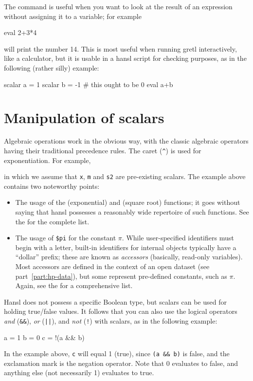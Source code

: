 
The  command is useful when you want to look at the result
of an expression without assigning it to a variable; for example
\begin{code}
  eval 2+3*4
\end{code}
will print the number 14. This is most useful when running gretl
interactively, like a calculator, but it is usable in a hansl script
for checking purposes, as in the following (rather silly) example:
\begin{code}
  scalar a = 1
  scalar b = -1
  # this ought to be 0
  eval a+b
\end{code}

\section{Manipulation of scalars}

Algebraic operations work in the obvious way, with the classic
algebraic operators having their traditional precedence rules. The
caret (\verb|^|) is used for exponentiation. For example,
in which we assume that \texttt{x}, \texttt{m} and \texttt{s2} are
pre-existing scalars. The example above contains two noteworthy
points:
\begin{itemize}
\item The usage of the  (exponential) and  (square
  root) functions; it goes without saying that hansl possesses a
  reasonably wide repertoire of such functions. See the \GCR{} for the
  complete list.
\item The usage of \verb|$pi| for the constant $\pi$. While
  user-specified identifiers must begin with a letter, built-in
  identifiers for internal objects typically have a ``dollar'' prefix;
  these are known as \emph{accessors} (basically, read-only
  variables).  Most accessors are defined in the context of an open
  dataset (see part~\ref{part:hp-data}), but some represent
  pre-defined constants, such as $\pi$. Again, see the \GCR{} for a
  comprehensive list.
\end{itemize}

Hansl does not possess a specific Boolean type, but scalars can be
used for holding true/false values. It follows that you can also use
the logical operators \emph{and} (\verb|&&|), \emph{or} (\verb+||+),
and \emph{not} (\verb|!|) with scalars, as in the following example:
\begin{code}
  a = 1
  b = 0
  c = !(a && b) 
\end{code}
In the example above, \texttt{c} will equal 1 (true), since
\verb|(a && b)| is false, and the exclamation mark is the negation
operator.  Note that 0 evaluates to false, and anything else (not
necessarily 1) evaluates to true.

